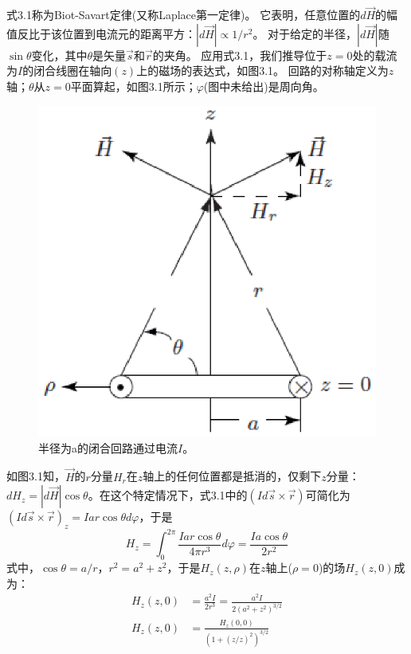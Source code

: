 式3.1称为Biot-Savart定律(又称Laplace第一定律)。
它表明，任意位置的$d\vec{H}$的幅值反比于该位置到电流元的距离平方：$|d\vec{H}|\propto 1/r^2$。
对于给定的半径，$|d\vec{H}|$随$\sin\theta$变化，其中$\theta$是矢量$\vec{s}$和$\vec{r}$的夹角。
应用式3.1，我们推导位于$z=0$处的载流为$I$的闭合线圈在轴向$(z)$上的磁场的表达式，如图3.1。
回路的对称轴定义为$z$轴；$\theta$从$z=0$平面算起，如图3.1所示；$\varphi$(图中未给出)是周向角。
\begin{figure}[htbp]
  \centering
 \includegraphics[scale=0.7]{chpt3/figs/fig3.1.eps}
  \caption{半径为a的闭合回路通过电流$I$。}
\end{figure}
如图3.1知，$\vec{H}$的$r$分量$H_r$在$z$轴上的任何位置都是抵消的，仅剩下$z$分量：
$dH_z=|d\vec{H}|\cos\theta$。在这个特定情况下，式3.1中的$(Id\vec{s}\times \vec{r})$可简化为
$(Id\vec{s}\times \vec{r})_z=Iar\cos\theta d\varphi$，于是
\begin{equation}\label{eqn:bs law z1}
  H_z=\int_{0}^{2\pi}\frac{Iar\cos\theta}{4\pi r^3}d\varphi=\frac{Ia\cos\theta}{2r^2}
\end{equation}
式中，$\cos\theta=a/r$，$r^2=a^2+z^2$，于是$H_z(z,\rho)$在$z$轴上($\rho=0$)的场$H_z(z,0)$成为：
\begin{subequations}\label{eqn:bs law z2}
	\begin{align}
H_z(z,0)&=\frac{a^2I}{2r^3}=\frac{a^2I}{2(a^2+z^2)^{3/2}} \\
H_z(z,0)&=\frac{H_z(0,0)}{(1+(z/z)^2)^{3/2}} %
\end{align}
\end{subequations}


